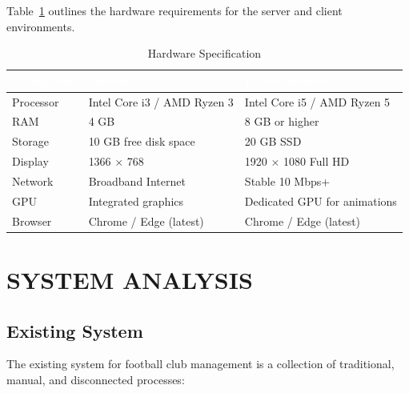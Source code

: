 \documentclass[12pt,a4paper,oneside]{report}
\begin{document}
Table~\ref{tab:hardware} outlines the hardware requirements for the server and client environments.

\begin{table}[H]
\centering
\caption{Hardware Specification}
\label{tab:hardware}
\small
\begin{tabularx}{\textwidth}{|l|X|X|}
\hline
\rowcolor{tableHeader}
\textcolor{white}{\textbf{Component}} & \textcolor{white}{\textbf{Minimum}} & \textcolor{white}{\textbf{Recommended}} \\
\hline
Processor & Intel Core i3 / AMD Ryzen 3        & Intel Core i5 / AMD Ryzen 5 \\
\hline\rowcolor{tableRow}
RAM       & 4 GB                                & 8 GB or higher \\
\hline
Storage   & 10 GB free disk space               & 20 GB SSD \\
\hline\rowcolor{tableRow}
Display   & 1366 $\times$ 768                   & 1920 $\times$ 1080 Full HD \\
\hline
Network   & Broadband Internet                  & Stable 10 Mbps+ \\
\hline\rowcolor{tableRow}
GPU       & Integrated graphics                 & Dedicated GPU for animations \\
\hline
Browser   & Chrome / Edge (latest)              & Chrome / Edge (latest) \\
\hline
\end{tabularx}
\end{table}

\chapter{SYSTEM ANALYSIS}

\section{Existing System}

The existing system for football club management is a collection of traditional, manual, and disconnected processes:
\end{document}
